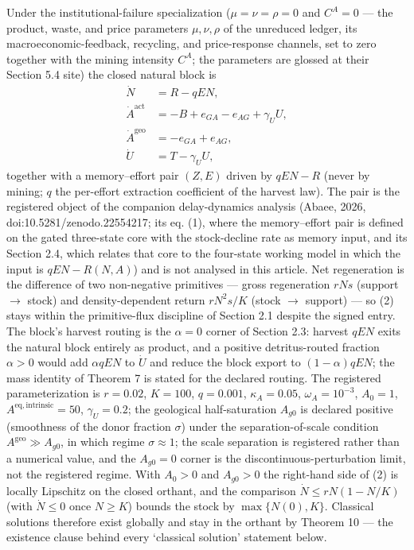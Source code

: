\documentclass[11pt]{article}
\begin{document}
Under the institutional-failure specialization (\(\mu = \nu = \rho = 0\)
and \(C^A = 0\) --- the product, waste, and price parameters
\(\mu, \nu, \rho\) of the unreduced ledger, its macroeconomic-feedback,
recycling, and price-response channels, set to zero together with the
mining intensity \(C^A\); the parameters are glossed at their Section
5.4 site) the closed natural block is \[\begin{aligned}
\dot N &= R - qEN, \\
\dot A^{\mathrm{act}} &= -B + e_{GA} - e_{AG} + \gamma_U U, \\
\dot A^{\mathrm{geo}} &= -e_{GA} + e_{AG}, \\
\dot U &= T - \gamma_U U,
\end{aligned} \tag{2}\] together with a memory--effort pair \((Z, E)\)
driven by \(qEN - R\) (never by mining; \(q\) the per-effort extraction
coefficient of the harvest law). The pair is the registered object of
the companion delay-dynamics analysis (Abaee, 2026, doi:10.5281/zenodo.22554217; its eq. (1), where the memory--effort pair is defined on the
gated three-state core with the stock-decline rate as memory input, and its Section 2.4, which relates that
core to the four-state working model in which the input is \(qEN - R(N, A)\)) and is not analysed in this
article. Net regeneration is the difference of two non-negative
primitives --- gross regeneration \(rNs\) (support \(\to\) stock) and
density-dependent return \(rN^2 s/K\) (stock \(\to\) support) --- so (2)
stays within the primitive-flux discipline of Section 2.1 despite the
signed entry. The block's harvest routing is the \(\alpha = 0\) corner
of Section 2.3: harvest \(qEN\) exits the natural block entirely as
product, and a positive detritus-routed fraction \(\alpha > 0\) would
add \(\alpha qEN\) to \(\dot U\) and reduce the block export to
\((1-\alpha)qEN\); the mass identity of Theorem 7 is stated for the
declared routing. The registered parameterization is \(r = 0.02\),
\(K = 100\), \(q = 0.001\), \(\kappa_A = 0.05\), \(\omega_A = 10^{-3}\),
\(A_0 = 1\), \(A^{\mathrm{eq,intrinsic}} = 50\), \(\gamma_U = 0.2\); the
geological half-saturation \(A_{g0}\) is declared positive (smoothness
of the donor fraction \(\sigma\)) under the separation-of-scale
condition \(A^{\mathrm{geo}} \gg A_{g0}\), in which regime
\(\sigma \approx 1\); the scale separation is registered rather than a
numerical value, and the \(A_{g0} = 0\) corner is the
discontinuous-perturbation limit, not the registered regime. With
\(A_0 > 0\) and \(A_{g0} > 0\) the right-hand side of (2) is locally
Lipschitz on the closed orthant, and the comparison
\(\dot N \le rN(1 - N/K)\) (with \(\dot N \le 0\) once \(N \ge K\))
bounds the stock by \(\max\{N(0), K\}\). Classical solutions therefore
exist globally and stay in the orthant by Theorem 10 --- the existence
clause behind every `classical solution' statement below.
\end{document}

